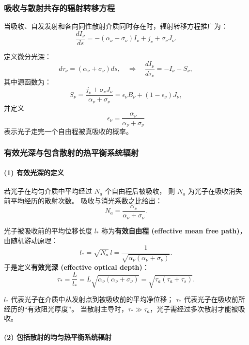 \subsubsection{吸收与散射共存的辐射转移方程}

当吸收、自发发射和各向同性散射介质同时存在时，辐射转移方程推广为：
\[
\frac{dI_\nu}{ds}
= -(\alpha_\nu + \sigma_\nu) I_\nu + j_\nu + \sigma_\nu J_\nu.
\]

定义微分光深：
\[
d\tau_\nu = (\alpha_\nu + \sigma_\nu) ds,
\quad\Rightarrow\quad
\frac{dI_\nu}{d\tau_\nu} = -I_\nu + S_\nu,
\]
其中源函数为：
\[
S_\nu = \frac{j_\nu + \sigma_\nu J_\nu}{\alpha_\nu + \sigma_\nu}
      = \epsilon_\nu B_\nu + (1 - \epsilon_\nu) J_\nu,
\]
并定义
\[
\epsilon_\nu = \frac{\alpha_\nu}{\alpha_\nu + \sigma_\nu}
\]
表示光子走完一个自由程被真吸收的概率。

\subsubsection*{有效光深与包含散射的热平衡系统辐射}


\paragraph{(1) 有效光深的定义}

若光子在均匀介质中平均经过 $N_a$ 个自由程后被吸收，
则 $N_a$ 为光子在吸收消失前平均经历的散射次数。
吸收与消光系数之比给出：
\[
N_a = \frac{\alpha_\nu}{\alpha_\nu + \sigma_\nu}.
\]

光子被吸收前的平均位移长度 $l_*$ 称为\textbf{有效自由程 (effective mean free path)}，
由随机游动原理：
\[
l_* = \sqrt{N_a}\, l
     = \frac{1}{\sqrt{\alpha_\nu(\alpha_\nu+\sigma_\nu)}}.
\]
于是定义\textbf{有效光深 (effective optical depth)}：
\[
\tau_* = \frac{L}{l_*}
       = L\sqrt{\alpha_\nu(\alpha_\nu+\sigma_\nu)}
       = \sqrt{\tau_a(\tau_a+\tau_s)}.
\]

\begin{derivationnote}[物理含义]
$l_*$ 代表光子在介质中从发射点到被吸收前的平均净位移；
$\tau_*$ 代表光子在吸收前所经历的“有效阻光厚度”。
当散射主导时，$\tau_* \gg \tau_a$，光子需经过多次散射才能被吸收。
\end{derivationnote}

\paragraph{(2) 包括散射的均匀热平衡系统辐射}

